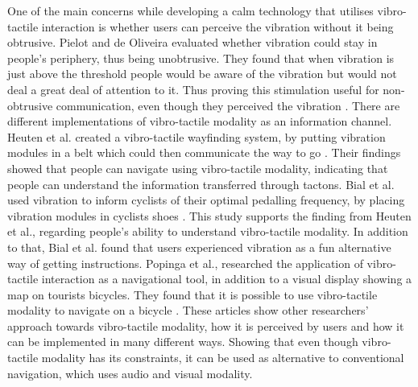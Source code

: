 \documentclass{sigchi}
\begin{document}
One of the main concerns while developing a calm technology that utilises vibro-tactile interaction is whether users can perceive the vibration without it being obtrusive. Pielot and de Oliveira evaluated whether vibration could stay in people's periphery, thus being unobtrusive. They found that when vibration is just above the threshold people would be aware of the vibration but would not deal a great deal of attention to it. Thus proving this stimulation useful for non-obtrusive communication, even though they perceived the vibration \cite{pielot13}.  
\newline
\newline
There are different implementations of vibro-tactile modality as an information channel. Heuten et al. created a vibro-tactile wayfinding system, by putting vibration modules in a belt which could then communicate the way to go \cite{heuten08}. Their findings showed that people can navigate using vibro-tactile modality, indicating that people can understand the information transferred through tactons. 
Bial et al. used vibration to inform cyclists of their optimal pedalling frequency, by placing vibration modules in cyclists shoes \cite{bial11}. This study supports the finding from Heuten et al., regarding people's ability to understand vibro-tactile modality. In addition to that, Bial et al. found that users experienced vibration as a fun alternative way of getting instructions. 
\newline
\newline
Popinga et al., researched the application of vibro-tactile interaction as a navigational tool, in addition to a visual display showing a map on tourists bicycles. They found that it is possible to use vibro-tactile modality to navigate on a bicycle \cite{poppinga09}.
\newline
\newline
These articles show other researchers' approach towards vibro-tactile modality, how it is perceived by users and how it can be implemented in many different ways. Showing that even though vibro-tactile modality has its constraints, it can be used as alternative to conventional navigation, which uses audio and visual modality.
\end{document}
